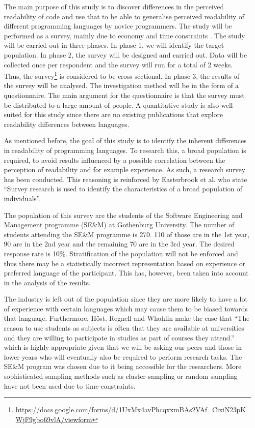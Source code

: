 \documentclass[times, 10pt,twocolumn]{Article}
\begin{document}
The main purpose of this study is to discover differences in the perceived readability of code and use that to be able to generalise perceived readability of different programming languages by novice programmers. The study will be performed as a survey, mainly due to economy and time constraints \cite{fowler2008survey}. The study will be carried out in three phases. In phase 1, we will identify the target population. In phase 2, the survey will be designed and carried out. Data will be collected once per respondent and the survey will run for a total of 2 weeks. Thus, the survey\footnote{\url{https://docs.google.com/forms/d/1UxMx4avPhcqxxmBAs2VAf_CixiN23pKWjF9gbo69vlA/viewform}} is considered to be cross-sectional. In phase 3, the results of the survey will be analysed. The investigation method will be in the form of a questionnaire. The main argument for the questionnaire is that the survey must be distributed to a large amount of people. A quantitative study is also well-suited for this study since there are no existing publications that explore readability differences between languages. 


As mentioned before, the goal of this study is to identify the inherent differences in readability of programming languages. To research this, a broad population is required, to avoid results influenced by a possible correlation between the perception of readability and for example experience. As such, a research survey has been conducted. This reasoning is reinforced by Easterbrook et al. \cite{easterbrook2008selecting} who state ``Survey research is used to identify the characteristics of a broad population of individuals''. 

The population of this survey are the students of the Software Engineering and Management programme (SE\&M) at Gothenburg University. The number of students attending the SE\&M programme is 270. 110 of those are in the 1st year, 90 are in the 2nd year and the remaining 70 are in the 3rd year. The desired response rate is 10\%. Stratification of the population will not be enforced and thus there may be a statistically incorrect representation based on experience or preferred language of the participant. This has, however, been taken into account in the analysis of the results. 

The industry is left out of the population since they are more likely to have a lot of experience with certain languages which may cause them to be biased towards that language. Furthermore, Höst, Regnell and Whohlin \cite{host2000using} make the case that ``The reason to use students as subjects is often that they are available at universities and they are willing to participate in studies as part of courses they attend.'' which is highly appropriate given that we will be asking our peers and those in lower years who will eventually also be required to perform research tasks. The SE\&M program was chosen due to it being accessible for the researchers. More sophisticated sampling methods such as cluster-sampling or random sampling have not been used due to time-constraints. 
\end{document}

